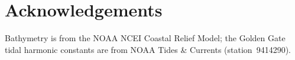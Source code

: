 \documentclass[Journal]{ascelike}   %
\begin{document}
\section*{Acknowledgements}
Bathymetry is from the NOAA NCEI Coastal Relief Model; the Golden Gate tidal
harmonic constants are from NOAA Tides \& Currents (station~9414290).


\end{document}
